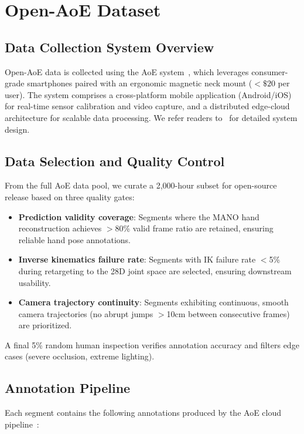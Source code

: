 \section{Open-AoE Dataset}

\subsection{Data Collection System Overview}

Open-AoE data is collected using the AoE system~\cite{aoe2026}, which leverages consumer-grade smartphones paired with an ergonomic magnetic neck mount ($<\$20$ per user). The system comprises a cross-platform mobile application (Android/iOS) for real-time sensor calibration and video capture, and a distributed edge-cloud architecture for scalable data processing. We refer readers to~\cite{aoe2026} for detailed system design.

\subsection{Data Selection and Quality Control}

From the full AoE data pool, we curate a 2,000-hour subset for open-source release based on three quality gates:

\begin{itemize}
    \item \textbf{Prediction validity coverage}: Segments where the MANO hand reconstruction achieves $>$80\% valid frame ratio are retained, ensuring reliable hand pose annotations.
    \item \textbf{Inverse kinematics failure rate}: Segments with IK failure rate $<$5\% during retargeting to the 28D joint space are selected, ensuring downstream usability.
    \item \textbf{Camera trajectory continuity}: Segments exhibiting continuous, smooth camera trajectories (no abrupt jumps $>$10cm between consecutive frames) are prioritized.
\end{itemize}

A final 5\% random human inspection verifies annotation accuracy and filters edge cases (severe occlusion, extreme lighting).

\subsection{Annotation Pipeline}

Each segment contains the following annotations produced by the AoE cloud pipeline~\cite{aoe2026}:

